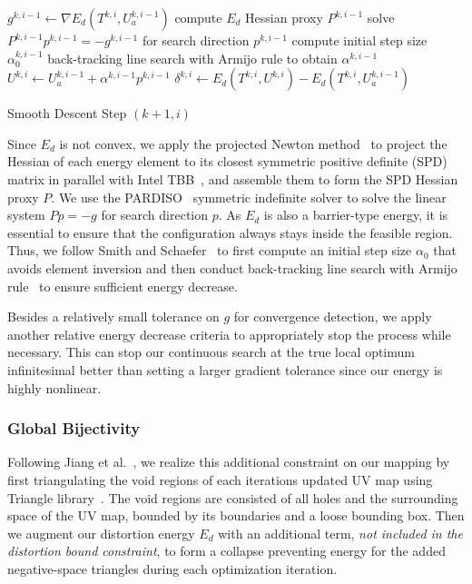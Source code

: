 \begin{algorithm}[h]
\SetAlgoLined
{}
$g^{k,i-1} \leftarrow \nabla E_{d}(T^{k,i}, U_a^{k,i-1})$\;
compute $E_{d}$ Hessian proxy $P^{k,i-1}$\;
solve $P^{k,i-1} p^{k,i-1} = -g^{k,i-1}$ for search direction $p^{k,i-1}$\;
compute initial step size $\alpha^{k,i-1}_0$\;
back-tracking line search with Armijo rule to obtain $\alpha^{k,i-1}$\;
$U^{k,i} \leftarrow U_a^{k,i-1} + \alpha^{k,i-1} p^{k,i-1}$\;
$\delta^{k,i} \leftarrow E_{d}(T^{k,i}, U^{k,i}) - E_{d}(T^{k,i}, U_a^{k,i-1})$\;
\caption{Smooth Descent Step $(k+1,i)$}
\label{alg:descentStep}
\end{algorithm}
Since $E_{d}$ is not convex, we apply the projected Newton method\ \cite{Teran2005Robust} to project the Hessian of each energy element to its closest symmetric positive definite (SPD) matrix in parallel with Intel TBB~\cite{Reinders2007Intel}, and assemble them to form the SPD Hessian proxy $P$. We use the PARDISO~\cite{pardiso-6.0a, pardiso-6.0b} symmetric indefinite solver to solve the linear system $P p = -g$ for search direction $p$.  As $E_{d}$ is also a barrier-type energy, it is essential to ensure that the configuration always stays inside the feasible region. Thus, we follow Smith and Schaefer~ to first compute an initial step size $\alpha_0$ that avoids element inversion and then conduct back-tracking line search with Armijo rule~\cite{Armijo1966Minimization} to ensure sufficient energy decrease.

Besides a relatively small tolerance on $g$ for convergence detection, we apply another relative energy decrease criteria to appropriately stop the process while necessary.
This can stop our continuous search at the true local optimum infinitesimal better than setting a larger gradient tolerance since our energy is highly nonlinear.

\subsubsection{Global Bijectivity}
\label{sec:bijectivity}
Following Jiang et al.\ , we realize this additional constraint on our mapping by first triangulating the void regions of each iterations updated UV map using Triangle library\ \cite{Triangle_Engineering_a_2D_quality_mesh_generator_and_Delaunay_triangulator}. The void regions are consisted of all holes and the surrounding space of the UV map, bounded by its boundaries and a loose bounding box.
Then we augment our distortion energy $E_d$ with an additional term, \emph{not included in the distortion bound constraint}, to form a collapse preventing energy for the added negative-space triangles during each optimization iteration.

